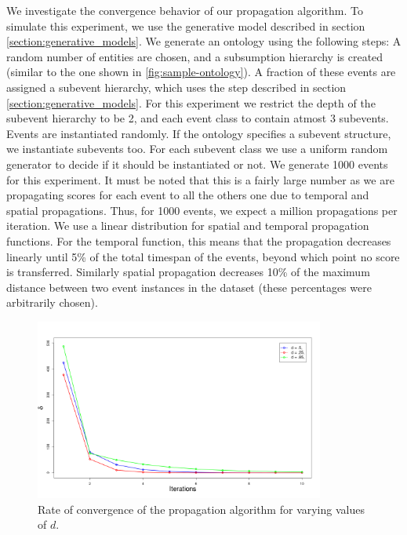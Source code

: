 We investigate the convergence behavior of our propagation algorithm. To simulate this experiment, we use the generative model described in section \ref{section:generative_models}. We generate an ontology using the following steps: A random number of entities are chosen, and a subsumption hierarchy is created (similar to the one shown in \ref{fig:sample-ontology}). A fraction of these events are assigned a subevent hierarchy, which uses the step described in section \ref{section:generative_models}. For this experiment we restrict the depth of the subevent hierarchy to be 2, and each event class to contain atmost 3 subevents. Events are instantiated randomly. If the ontology specifies a subevent structure, we instantiate subevents too. For each subevent class we use a uniform random generator to decide if it should be instantiated or not. We generate 1000 events for this experiment. It must be noted that this is a fairly large number as we are propagating scores for each event to all the others one due to temporal and spatial propagations. Thus, for 1000 events, we expect a million propagations per iteration. We use a linear distribution for spatial and temporal propagation functions. For the temporal function, this means that the propagation decreases linearly until 5\% of the total timespan of the events, beyond which point no score is transferred. Similarly spatial propagation decreases 10\% of the maximum distance between two event instances in the dataset (these percentages were arbitrarily chosen).

\begin{figure}[h!]
\centering
\includegraphics[width=0.85\textwidth]{media/chapter6/convergences.png}
\caption{Rate of convergence of the propagation algorithm for varying values of $d$.}
\label{fig:convergences}
\end{figure}

